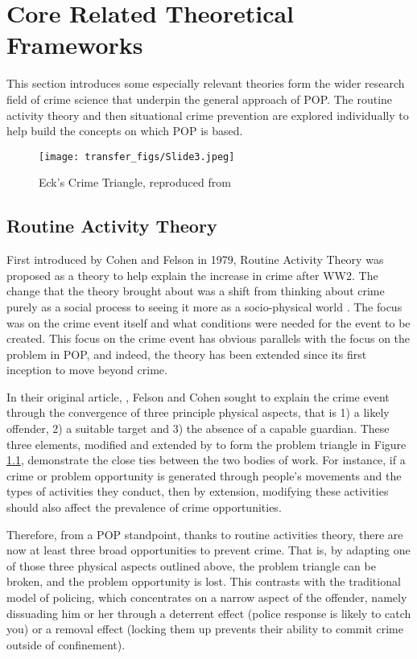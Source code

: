 \chapter{Core Related Theoretical Frameworks} This section introduces some especially relevant theories form the wider research field of crime science that underpin the general approach of POP. The routine activity theory \parencite{cohen1979social}and then situational crime prevention \parencite{clarke1997situational} are explored individually to help build the concepts on which POP is based.

\begin{figure}
  \texttt{[image: transfer\_figs/Slide3.jpeg]}
  \caption{Eck's Crime Triangle, reproduced from \cite{eck2003police}}
  \label{fig:triangle}
\end{figure}

\section{Routine Activity Theory}  First introduced by Cohen and Felson in 1979, Routine Activity Theory was proposed as a theory to help explain the increase in crime after WW2. The change that the theory brought about was a shift from thinking about crime purely as a social process to seeing it more as a socio-physical world \parencite{ratchap4}. The focus was on the crime event itself and what conditions were needed for the event to be created. This focus on the crime event has obvious parallels with the focus on the problem in POP, and indeed, the theory has been extended since its first inception to move beyond crime.

In their original article, \parencite{cohen1979social}, Felson and Cohen sought to explain the crime event through the convergence of three principle physical aspects, that is 1) a likely offender, 2) a suitable target and 3) the absence of a capable guardian. These three elements, modified and extended by \parencite{eck2003police} to form the problem triangle in Figure \ref{fig:triangle}, demonstrate the close ties between the two bodies of work. For instance, if a crime or problem opportunity is generated through people’s movements and the types of activities they conduct, then by extension, modifying these activities should also affect the prevalence of crime opportunities.

Therefore, from a POP standpoint, thanks to routine activities theory, there are now at least three broad opportunities to prevent crime. That is, by adapting one of those three physical aspects outlined above, the problem triangle can be broken, and the problem opportunity is lost. This contrasts with the traditional model of policing, which concentrates on a narrow aspect of the offender, namely dissuading him or her through a deterrent effect (police response is likely to catch you) or a removal effect (locking them up prevents their ability to commit crime outside of confinement).


